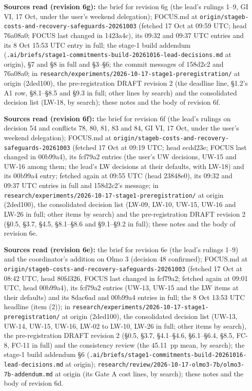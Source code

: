 \documentclass{article}
\theoremstyle{plain}
\theoremstyle{definition}
\theoremstyle{remark}
\begin{document}
\textbf{Sources read (revision 6g):} the brief for revision 6g (the lead's
rulings 1--9, GI VI, 17 Oct, under the user's weekend delegation); FOCUS.md at
\nolinkurl{origin/stageb-costs-and-recovery-safeguards-20261003} (fetched 17 Oct
at 09:59 UTC; head 76a08a0; FOCUS last changed in 1423a4c), its 09:32 and 09:37
UTC entries and its 8 Oct 15:53 UTC entry in full; the stage-1 build addendum
(\nolinkurl{.ai/briefs/stage1-commitments-build-20261016-lead-decisions.md} at
origin), \S{}7 and \S{}8 in full and \S{}3--\S{}6; the commit messages of
158d2c2 and 76a08a0; in
\nolinkurl{research/experiments/2026-10-17-stage1-preregistration/} at origin
(2ded100), the pre-registration DRAFT revision 2 (the deadline line, \S{}1.2's
A1 row, \S{}8.1--\S{}8.5 and \S{}9.3 in full; other lines by search) and the
consolidated decision list (LW-18, by search); these notes and the body of
revision 6f.

\textbf{Sources read (revision 6f):} the brief for revision 6f (the lead's
rulings on decision 54 and conflicts 78, 80, 81, 83 and 84, GI VI, 17 Oct, under
the user's weekend delegation); FOCUS.md at
\nolinkurl{origin/stageb-costs-and-recovery-safeguards-20261003} (fetched 17 Oct
at 09:19 UTC; head ecdd23e; FOCUS last changed in 00b99a4), its fcf79a2 entries
(the user's UW decisions, UW-15 and UW-16 among them; the lead's LW decisions at
their defaults, with LW-18) and its 00b99a4 entry; fetched again at 09:55 UTC
(head 23848e0), its 09:32 and 09:37 UTC entries in full and 158d2c2's message;
in \nolinkurl{research/experiments/2026-10-17-stage1-preregistration/} at origin
(2ded100), the consolidated decision list (LW-09, LW-10, UW-15, UW-16 and LW-26
in full; other items by search) and the pre-registration DRAFT revision 2
(\S{}0.5, \S{}3.7, \S{}4.5, \S{}8.1--\S{}8.6 and \S{}9.1--\S{}9.2 in full);
these notes and the body of revision 6e.

\textbf{Sources read (revision 6e):} the brief for revision 6e (the lead's
rulings 1--9) and the coordinator's addition on Olmo 3 (decision 48 confirmed);
FOCUS.md at \nolinkurl{origin/stageb-costs-and-recovery-safeguards-20261003}
(fetched 17 Oct at 08:42 UTC, head 80fd326, FOCUS last changed in fcf79a2;
fetched again at 09:01 UTC, head 00b99a4), its fcf79a2 entries (UW-13, UW-15 and
the LW items at their defaults) and its 8dac6ad and 00b99a4 entries in full; the
8 Oct 13:53 UTC headline (item (2)); in
\nolinkurl{research/experiments/2026-10-17-stage1-preregistration/} at origin
(2ded100), the consolidated decision list (UW-13, UW-14, UW-15, UW-16, LW-02 to
LW-10, LW-26 in full; other items by search), the pre-registration DRAFT
revision 2 (\S{}0.5, \S{}3.7, \S{}4.1--\S{}4.6, \S{}6.1--\S{}6.4, \S{}8.5, FC-8,
FC-11 in full) and the consistency review (the 45.11~pp mean, by search); the
stage-1 build addendum \S{}6
(\nolinkurl{.ai/briefs/stage1-commitments-build-20261016-lead-decisions.md} at
origin); \nolinkurl{research/review/2026-10-17-olmo3-7b/olmo3-7b-addendum.md} at
origin (its Gate A cost lines, by search); these notes and the body of revision
6d.
\end{document}
